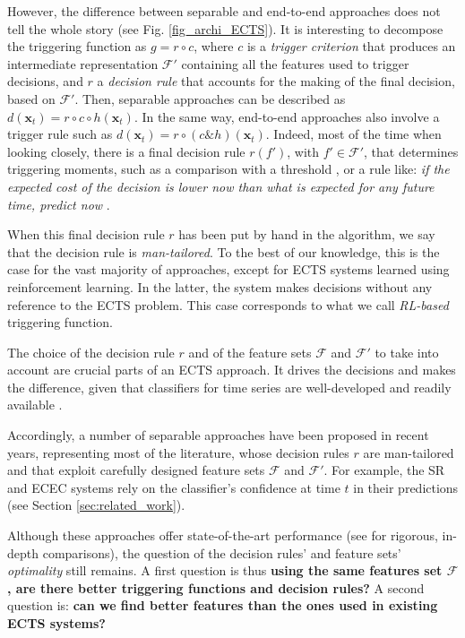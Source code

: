 \documentclass[sigconf, nonacm, table]{acmart}
\begin{document}
However, the difference between separable and end-to-end approaches does not tell the whole story (see Fig. \ref{fig_archi_ECTS}). 
It is interesting to decompose the triggering function as $g = r \circ c$, where $c$ is a \textit{trigger criterion} that produces an intermediate representation $\mathcal{F}'$ containing all the features used to trigger decisions, and $r$ a \textit{decision rule} that accounts for the making of the final decision, based on $\mathcal{F}'$.  
Then, separable approaches can be described as $d(\mathbf{x}_t) = r \circ c \circ h(\mathbf{x}_t)$. 
In the same way, end-to-end approaches also involve a trigger rule such as $d(\mathbf{x}_t)=r \circ (c \& h)(\mathbf{x}_t)$.  
Indeed, most of the time when looking closely, there is a final decision rule $r(f')$, with $f' \in \mathcal{F}'$, that determines triggering moments, such as a comparison with a threshold \cite{mori2019early}, or a rule like: \textit{if the expected cost of the decision is lower now than what is expected for any future time, predict now} \cite{achenchabe2021early}. 





When this final decision rule $r$ has been put by hand in the algorithm, we say that the decision rule is \textit{man-tailored}. To the best of our knowledge, this is the case for the vast majority of approaches, except for ECTS systems learned using reinforcement learning. In the latter, the system makes decisions
without any reference to the ECTS problem. This case corresponds to what we call \textit{RL-based} triggering function.

The choice of the decision rule $r$ and of the feature sets $\mathcal{F}$ and $\mathcal{F}'$ to take into account are crucial parts of an ECTS approach. It drives the decisions and makes the difference, given that classifiers for time series are well-developed and readily available \cite{bagnall2017great, ruiz2021great}.

Accordingly, a number of separable approaches have been proposed in recent years, representing most of the literature, whose decision rules $r$ are man-tailored and that exploit carefully designed feature sets $\mathcal{F}$ and $\mathcal{F}'$.
For example, the SR \cite{mori2017early} and ECEC \cite{lv2019effective} systems rely on the classifier's confidence at time $t$ in their predictions (see Section \ref{sec:related_work}). 


Although these approaches offer state-of-the-art performance (see \cite{renault2024early} for rigorous, in-depth comparisons), the question of the decision rules' and feature sets' \textit{optimality} still remains. A first question is thus \textbf{using the same features set $\mathcal{F}$, are there better triggering functions and decision rules?}
A second question is: \textbf{can we find better features than the ones used in existing ECTS systems?}
\end{document}
